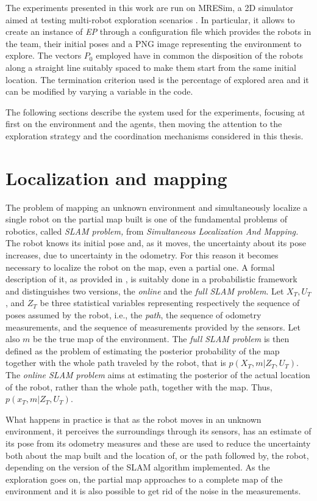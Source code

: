 The experiments presented in this work are run on MRESim, a 2D simulator
aimed at testing multi-robot exploration scenarios \cite{Spirin2015}.
In particular, it allows to create an instance of \emph{EP }through
a configuration file which provides the robots in the team, their
initial poses and a PNG image representing the environment to explore.
The vectors $P_{0}$ employed have in common the disposition of the
robots along a straight line suitably spaced to make them start from
the same initial location. The termination criterion used is the percentage
of explored area and it can be modified by varying a variable in the
code.

The following sections describe the system used for the experiments,
focusing at first on the environment and the agents, then moving the
attention to the exploration strategy and the coordination mechanisms
considered in this thesis. 

\section{Localization and mapping}

The problem of mapping an unknown environment and simultaneously localize
a single robot on the partial map built is one of the fundamental
problems of robotics, called \emph{SLAM problem,} from \emph{Simultaneous
Localization And Mapping. }The robot knows its initial pose and, as
it moves, the uncertainty about its pose increases, due to uncertainty
in the odometry. For this reason it becomes necessary to localize
the robot on the map, even a partial one. A formal description of
it, as provided in \cite{Thrun2008}, is suitably done
in a probabilistic framework and distinguishes two versions, the \emph{online
}and the \emph{full} \emph{SLAM problem}. Let $X_{T},U_{T}$, and
$Z_{T}$ be three statistical variables representing respectively
the sequence of poses assumed by the robot, i.e., the \emph{path},
the sequence of odometry measurements, and the sequence of measurements
provided by the sensors. Let also $m$ be the true map of the environment.
The \emph{full SLAM problem }is then defined as the problem of estimating
the posterior probability of the map together with the whole path
traveled by the robot, that is $p\left(X_{T},m|Z_{T},U_{T}\right)$.
The \emph{online SLAM problem }aims at estimating the posterior of
the actual location of the robot, rather than the whole path, together
with the map. Thus, $p\left(x_{T},m|Z_{T},U_{T}\right)$.

What happens in practice is that as the robot moves in an unknown
environment, it perceives the surroundings through its sensors, has
an estimate of its pose from its odometry measures and these are used
to reduce the uncertainty both about the map built and the location
of, or the path followed by, the robot, depending on the version of
the SLAM algorithm implemented. As the exploration goes on, the partial
map approaches to a complete map of the environment and it is also
possible to get rid of the noise in the measurements. 

